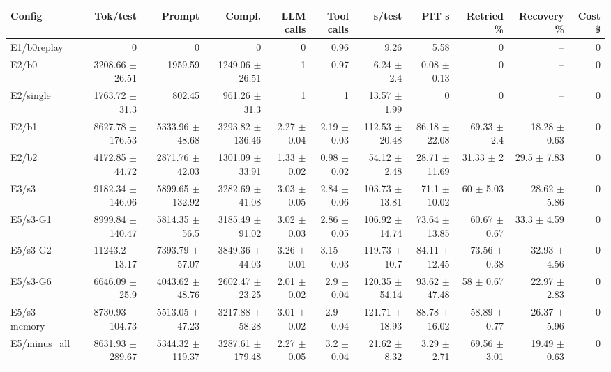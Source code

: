 \begin{tabular}{lrrrrrrrrrr}
\toprule
Config & Tok/test & Prompt & Compl. & LLM calls & Tool calls & s/test & PIT s & Retried \% & Recovery \% & Cost \$ \\
\midrule
E1/b0replay & 0 & 0 & 0 & 0 & 0.96 & 9.26 & 5.58 & 0 & -- & 0 \\
E2/b0 & 3208.66 $\pm$ 26.51 & 1959.59 & 1249.06 $\pm$ 26.51 & 1 & 0.97 & 6.24 $\pm$ 2.4 & 0.08 $\pm$ 0.13 & 0 & -- & 0 \\
E2/single & 1763.72 $\pm$ 31.3 & 802.45 & 961.26 $\pm$ 31.3 & 1 & 1 & 13.57 $\pm$ 1.99 & 0 & 0 & -- & 0 \\
E2/b1 & 8627.78 $\pm$ 176.53 & 5333.96 $\pm$ 48.68 & 3293.82 $\pm$ 136.46 & 2.27 $\pm$ 0.04 & 2.19 $\pm$ 0.03 & 112.53 $\pm$ 20.48 & 86.18 $\pm$ 22.08 & 69.33 $\pm$ 2.4 & 18.28 $\pm$ 0.63 & 0 \\
E2/b2 & 4172.85 $\pm$ 44.72 & 2871.76 $\pm$ 42.03 & 1301.09 $\pm$ 33.91 & 1.33 $\pm$ 0.02 & 0.98 $\pm$ 0.02 & 54.12 $\pm$ 2.48 & 28.71 $\pm$ 11.69 & 31.33 $\pm$ 2 & 29.5 $\pm$ 7.83 & 0 \\
E3/s3 & 9182.34 $\pm$ 146.06 & 5899.65 $\pm$ 132.92 & 3282.69 $\pm$ 41.08 & 3.03 $\pm$ 0.05 & 2.84 $\pm$ 0.06 & 103.73 $\pm$ 13.81 & 71.1 $\pm$ 10.02 & 60 $\pm$ 5.03 & 28.62 $\pm$ 5.86 & 0 \\
E5/s3-G1 & 8999.84 $\pm$ 140.47 & 5814.35 $\pm$ 56.5 & 3185.49 $\pm$ 91.02 & 3.02 $\pm$ 0.03 & 2.86 $\pm$ 0.05 & 106.92 $\pm$ 14.74 & 73.64 $\pm$ 13.85 & 60.67 $\pm$ 0.67 & 33.3 $\pm$ 4.59 & 0 \\
E5/s3-G2 & 11243.2 $\pm$ 13.17 & 7393.79 $\pm$ 57.07 & 3849.36 $\pm$ 44.03 & 3.26 $\pm$ 0.01 & 3.15 $\pm$ 0.03 & 119.73 $\pm$ 10.7 & 84.11 $\pm$ 12.45 & 73.56 $\pm$ 0.38 & 32.93 $\pm$ 4.56 & 0 \\
E5/s3-G6 & 6646.09 $\pm$ 25.9 & 4043.62 $\pm$ 48.76 & 2602.47 $\pm$ 23.25 & 2.01 $\pm$ 0.02 & 2.9 $\pm$ 0.04 & 120.35 $\pm$ 54.14 & 93.62 $\pm$ 47.48 & 58 $\pm$ 0.67 & 22.97 $\pm$ 2.83 & 0 \\
E5/s3-memory & 8730.93 $\pm$ 104.73 & 5513.05 $\pm$ 47.23 & 3217.88 $\pm$ 58.28 & 3.01 $\pm$ 0.02 & 2.9 $\pm$ 0.04 & 121.71 $\pm$ 18.93 & 88.78 $\pm$ 16.02 & 58.89 $\pm$ 0.77 & 26.37 $\pm$ 5.96 & 0 \\
E5/minus\_all & 8631.93 $\pm$ 289.67 & 5344.32 $\pm$ 119.37 & 3287.61 $\pm$ 179.48 & 2.27 $\pm$ 0.05 & 3.2 $\pm$ 0.04 & 21.62 $\pm$ 8.32 & 3.29 $\pm$ 2.71 & 69.56 $\pm$ 3.01 & 19.49 $\pm$ 0.63 & 0 \\
\bottomrule
\end{tabular}
